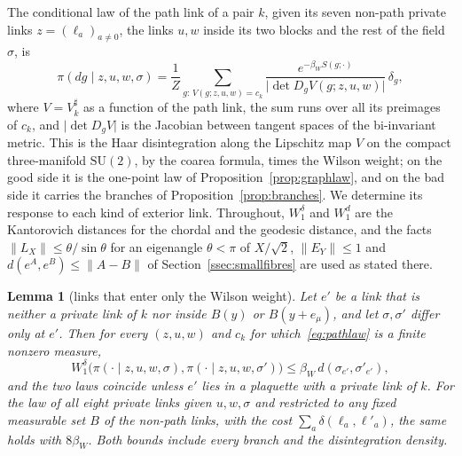 \documentclass[11pt]{amsart}
\newtheorem{lemma}[theorem]{Lemma}
\theoremstyle{definition}
\theoremstyle{remark}
\numberwithin{equation}{section}
\newcommand{\SU}{\mathrm{SU}}
\begin{document}
The conditional law of the path link of a pair $k$, given its seven
non-path private links $z=(\ell_a)_{a\ne0}$, the links $u,w$ inside its
two blocks and the rest of the field $\sigma$, is
\begin{equation}\label{eq:pathlaw}
\pi(dg\mid z,u,w,\sigma)=\frac1Z\sum_{g:\,V(g;z,u,w)=c_k}\frac{e^{-\beta_W
S(g;\cdot)}}{\lvert\det D_gV(g;z,u,w)\rvert}\,\delta_g ,
\end{equation}
where $V=V^\sharp_k$ as a function of the path link, the sum runs over all
its preimages of $c_k$, and $\lvert\det D_gV\rvert$ is the Jacobian between
tangent spaces of the bi-invariant metric. This is the Haar disintegration
along the Lipschitz map $V$ on the compact three-manifold $\SU(2)$, by the
coarea formula, times the Wilson weight; on the good side it is the
one-point law of Proposition~\ref{prop:graphlaw}, and on the bad side it
carries the branches of Proposition~\ref{prop:branches}. We determine its
response to each kind of exterior link. Throughout, $W_1^\delta$ and
$W_1^d$ are the Kantorovich distances for the chordal and the geodesic
distance, and the facts $\lVert L_X\rVert\le\theta/\sin\theta$ for an
eigenangle $\theta<\pi$ of $X/\sqrt2$, $\lVert E_Y\rVert\le1$ and $d(e^A,
e^B)\le\lVert A-B\rVert$ of Section~\ref{ssec:smallfibres} are used as stated
there.

\begin{lemma}[links that enter only the Wilson weight]\label{lem:wilsononly}
Let $e'$ be a link that is neither a private link of $k$ nor inside $B(y)$
or $B(y+e_\mu)$, and let $\sigma,\sigma'$ differ only at $e'$. Then for
every $(z,u,w)$ and $c_k$ for which~\eqref{eq:pathlaw} is a finite
nonzero measure,
\[
W_1^\delta\bigl(\pi(\cdot\mid z,u,w,\sigma),\pi(\cdot\mid z,u,w,\sigma')
\bigr)\le\beta_W\,d(\sigma_{e'},\sigma'_{e'}),
\]
and the two laws coincide unless $e'$ lies in a plaquette with a private
link of $k$. For the law of all eight private links given $u,w,\sigma$ and
restricted to any fixed measurable set $B$ of the non-path links, with the
cost $\sum_a\delta(\ell_a,\ell'_a)$, the same holds with $8\beta_W$. Both
bounds include every branch and the disintegration density.
\end{lemma}
\end{document}
